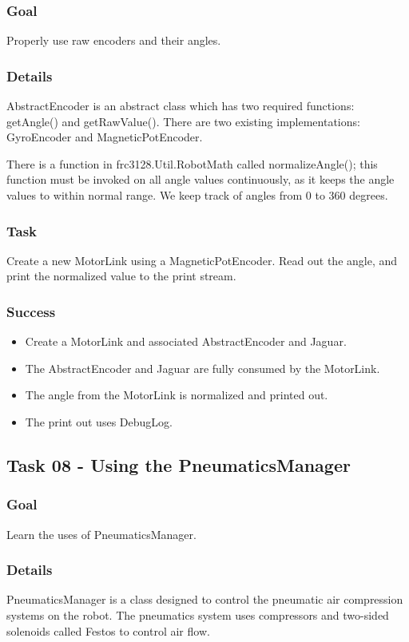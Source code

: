 \documentclass[a4paper]{article}
\begin{document}
\subsubsection{Goal} Properly use raw encoders and their angles.
\subsubsection{Details} AbstractEncoder is an abstract class which has two required functions: getAngle() and getRawValue(). There are two existing implementations: GyroEncoder and MagneticPotEncoder. 

There is a function in frc3128.Util.RobotMath called normalizeAngle(); this function must be invoked on all angle values continuously, as it keeps the angle values to within normal range. We keep track of angles from 0 to 360 degrees. 
\subsubsection{Task} Create a new MotorLink using a MagneticPotEncoder. Read out the angle, and print the normalized value to the print stream.
\subsubsection{Success}\begin{itemize}\item{Create a MotorLink and associated AbstractEncoder and Jaguar.}\item{The AbstractEncoder and Jaguar are fully consumed by the MotorLink.}\item{The angle from the MotorLink is normalized and printed out.}\item{The print out uses DebugLog.}\end{itemize}

\subsection{Task 08 - Using the PneumaticsManager}
\subsubsection{Goal} Learn the uses of PneumaticsManager.
\subsubsection{Details} PneumaticsManager is a class designed to control the pneumatic air compression systems on the robot. The pneumatics system uses compressors and two-sided solenoids called Festos to control air flow.
\end{document}
